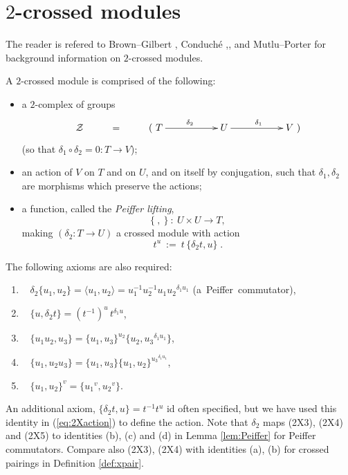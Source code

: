 
\section{$2$-crossed modules} \label{sect:2xmod}

The reader is refered to
Brown--Gilbert \cite{brow:gilb}, 
Conduch\'e \cite{conduche:jpaa},\cite{conduche:gmj}, 
and Mutlu--Porter \cite{mutlu:porter5} 
for background information on $2$-crossed modules.

\begin{defn} 
A $2$-crossed module is comprised of the following: 
\begin{itemize}
\item
a $2$-complex of groups
$$
\xymatrix{
\calZ 
  & = &  (~T \ar[rr]^{\delta_2} 
         &&  U \ar[rr]^{\delta_1}
             && V~) \\
}
$$
(so that  $\delta_1\circ\delta_2 = 0 : T \to V$);
\item
an action of $V$ on $T$ and on $U$, and on itself by conjugation,
such that $\delta_1, \delta_2$ are morphisms which preserve the actions;
\item
a function, called the \emph{Peiffer lifting},
$$
\{~,~\} ~:~ U \times U \to T,
$$
making $(\delta_2 : T \to U)$ a crossed module with action
\begin{equation} \label{eq:2Xaction}
t^u ~:=~ t\,\{\delta_2t,u\}\;.
\end{equation}
\end{itemize}
The following axioms are also required: 
\begin{enumerate}[{\rm (2X1)}]
\item~
$\delta_2\{u_1,u_2\} = \langle u_1, u_2 \rangle
                     = u_1^{-1} u_2^{-1} u_1 {u_2}^{\delta_1 u_1}$ 
\quad\mbox{(a Peiffer commutator)},
\item~
$\{u, \delta_2 t\} = (t^{-1})^u\, t^{\delta_1 u}$,
\item~ 
$\{u_1u_2, u_3\} = \{u_1,u_3\}^{u_2} \{u_2,{u_3}^{\delta_1 u_1}\}$,
\item~ 
$\{u_1, u_2u_3\} = \{u_1,u_3\} \{u_1,u_2\}^{{u_3}^{\delta_1 u_1}}$,
\item~ 
$\{u_1,u_2\}^v = \{{u_1}^v, {u_2}^v\}$.
\end {enumerate}
\end{defn}

\noindent
An additional axiom, $\{\delta_2t,u\} = t^{-1}t^u$ id often specified, 
but we have used this identity in (\ref{eq:2Xaction}) to define the action. 
Note that $\delta_2$ maps {(2X3)}, {(2X4)} and {(2X5)} 
to identities (b), (c) and (d) in Lemma \ref{lem:Peiffer} 
for Peiffer commutators. 
Compare also (2X3), (2X4) with identities (a), (b) for crossed pairings 
in Definition \ref{def:xpair}. 

